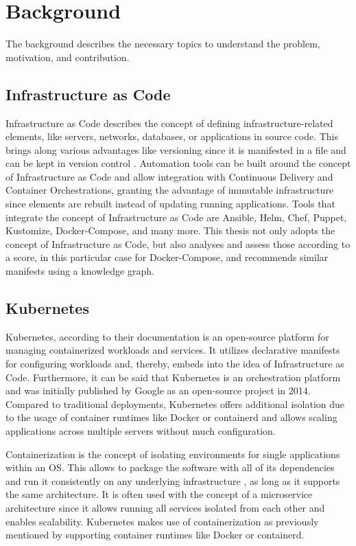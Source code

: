 \chapter{Background}
\label{sec:background}
The background describes the necessary topics to understand the problem, motivation, and contribution.

\section{Infrastructure as Code}
Infrastructure as Code describes the concept of defining infrastructure-related elements, like servers, networks, databases, or applications in source code. This brings along various advantages like versioning since it is manifested in a file and can be kept in version control \cite{iacArmon}. Automation tools can be built around the concept of Infrastructure as Code and allow integration with Continuous Delivery and Container Orchestrations, granting the advantage of immutable infrastructure since elements are rebuilt instead of updating running applications. Tools that integrate the concept of Infrastructure as Code are Ansible, Helm, Chef, Puppet, Kustomize, Docker-Compose, and many more. This thesis not only adopts the concept of Infrastructure as Code, but also analyses and assess those according to a score, in this particular case for Docker-Compose, and recommends similar manifests using a knowledge graph.

\section{Kubernetes}
Kubernetes, according to their documentation \cite{whatKubernetes} is an open-source platform for managing containerized workloads and services. It utilizes declarative manifests for configuring workloads and, thereby, embeds into the idea of Infrastructure as Code. Furthermore, it can be said that Kubernetes is an orchestration platform and was initially published by Google as an open-source project in 2014. Compared to traditional deployments, Kubernetes offers additional isolation due to the usage of container runtimes like Docker or containerd and allows scaling applications across multiple servers without much configuration.

Containerization is the concept of isolating environments for single applications within an OS. This allows to package the software with all of its dependencies and run it consistently on any underlying infrastructure \cite{containerization}, as long as it supports the same architecture. It is often used with the concept of a microservice architecture since it allows running all services isolated from each other and enables scalability. Kubernetes makes use of containerization as previously mentioned by supporting container runtimes like Docker or containerd.

